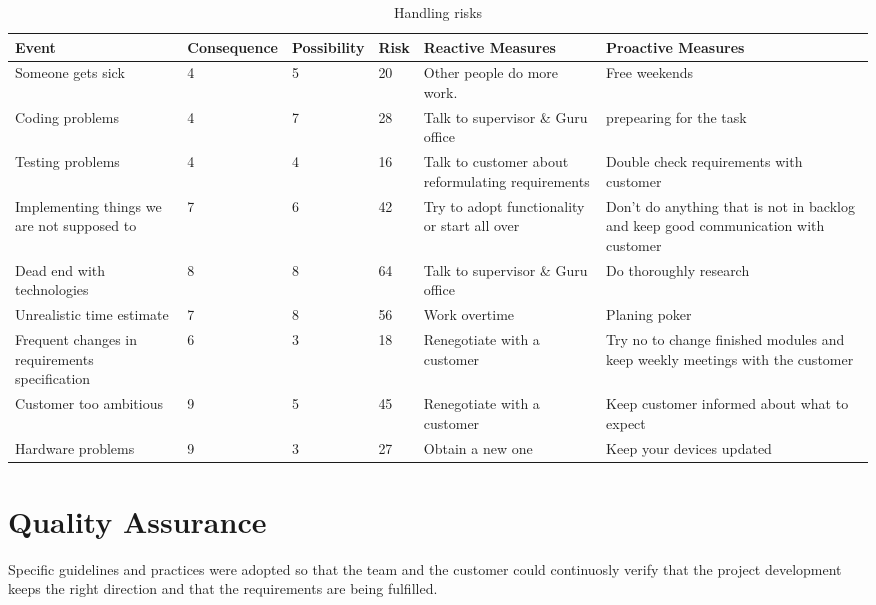 \documentclass{article}
\newcommand{\ra}[1]{\renewcommand{\arraystretch}{#1}}
\begin{document}
\begin{table*}\centering \ra{1.3}
    \caption{Handling risks}
    \label{tab:risks}
    \vspace{2mm} %
    \begin{sideways}
    \begin{tabularx}{500pt}{XlllXX}
    \toprule
        Event & Consequence & Possibility & Risk  & Reactive Measures & Proactive Measures \\
    \midrule
Someone gets sick & 4     & 5     & 20    & Other people do more work.  & Free weekends \\
Coding problems & 4     & 7     & 28    & Talk to supervisor \& Guru office & prepearing for the task \\
Testing problems & 4     & 4     & 16    & Talk to customer about reformulating requirements & Double check requirements with customer \\
Implementing things we are not supposed to & 7     & 6     & 42    & Try to adopt functionality or start all over & Don't do anything that is not in backlog and keep good communication with customer \\
Dead end with technologies & 8     & 8     & 64    & Talk to supervisor \& Guru office & Do thoroughly research \\
Unrealistic time estimate & 7     & 8     & 56    & Work overtime  & Planing poker \\
Frequent changes in requirements specification & 6     & 3     & 18    & Renegotiate with a customer & Try no to change finished modules and keep weekly meetings with the customer \\
Customer too ambitious & 9     & 5     & 45    & Renegotiate with a customer & Keep customer informed about what  to expect \\
Hardware problems & 9     & 3     & 27    & Obtain a new one & Keep your devices updated \\
    \bottomrule
    \end{tabularx}%
    \end{sideways}
\end{table*}
\section{Quality Assurance}
Specific guidelines and practices were adopted
so that the team and the customer could continuosly verify that the project development keeps the right direction and that the requirements are being fulfilled.
\end{document}
